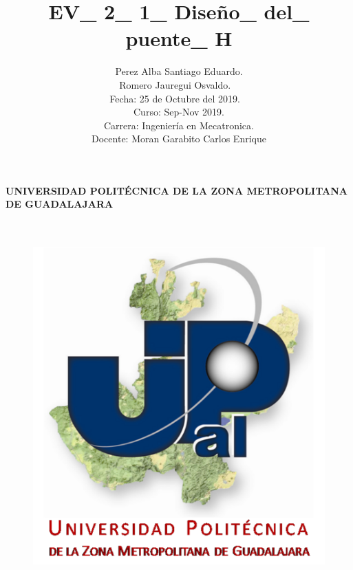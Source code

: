 \documentclass[12pt,letterpaper]{article}
\title{EV\_ 2\_ 1\_ Diseño\_ del\_ puente\_ H}
\begin{document}
\maketitle




\paragraph{ UNIVERSIDAD POLITÉCNICA DE LA ZONA METROPOLITANA DE GUADALAJARA}

\
\begin{figure}[h!]
\begin{center}

\includegraphics[scale=0.8]{Upzmg.png} 
\label{Upzmg}


\end{center}
\end{figure}


\

\author{Perez Alba Santiago Eduardo. \\ Romero Jauregui Osvaldo.
\

Fecha: 25 de Octubre del 2019.
\

Curso: Sep-Nov 2019.

\
Carrera: Ingeniería en Mecatronica.\

Docente: Moran Garabito Carlos Enrique}
\end{document}
